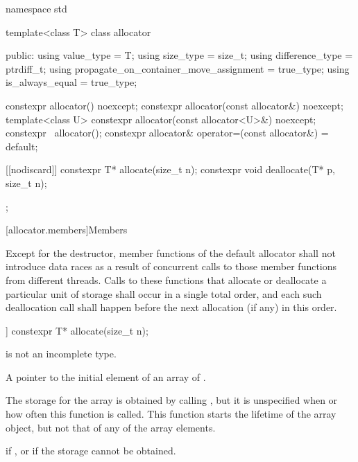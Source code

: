 %
%
%
%
%
%
%
\begin{codeblock}
namespace std {
  template<class T> class allocator {
   public:
    using value_type                             = T;
    using size_type                              = size_t;
    using difference_type                        = ptrdiff_t;
    using propagate_on_container_move_assignment = true_type;
    using is_always_equal                        = true_type;

    constexpr allocator() noexcept;
    constexpr allocator(const allocator&) noexcept;
    template<class U> constexpr allocator(const allocator<U>&) noexcept;
    constexpr ~allocator();
    constexpr allocator& operator=(const allocator&) = default;

    [[nodiscard]] constexpr T* allocate(size_t n);
    constexpr void deallocate(T* p, size_t n);
  };
}
\end{codeblock}

[allocator.members]{Members}

\pnum
Except for the destructor, member functions of the default allocator shall not introduce
data races as a result of concurrent calls to those member
functions from different threads. Calls to these functions that allocate or deallocate a
particular unit of storage shall occur in a single total order, and each such
deallocation call shall happen before the next allocation (if any) in this order.

%
\begin{itemdecl}
[[nodiscard]] constexpr T* allocate(size_t n);
\end{itemdecl}

\begin{itemdescr}
\pnum
\mandates
{} is not an incomplete type.

\pnum
\returns
A pointer to the initial element of an array of  .

\pnum
\remarks
The storage for the array
is obtained by calling ,
but it is unspecified when or how often this
function is called.
This function starts the lifetime of the array object,
but not that of any of the array elements.

\pnum
\throws
{} if
, or
 if the storage cannot be obtained.
\end{itemdescr}

